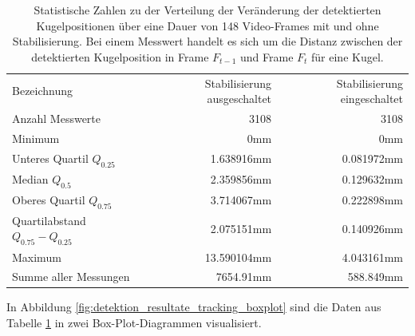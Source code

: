 \begin{table}[ht]
    \begin{tabular}{ lrr }
        \rowcolor{\seccolor!50}
        Bezeichnung & Stabilisierung ausgeschaltet & Stabilisierung eingeschaltet\\
        Anzahl Messwerte & 3108 & 3108\\
        Minimum & 0mm & 0mm\\
        Unteres Quartil $Q_{0.25}$ & 1.638916mm & 0.081972mm\\
        Median $Q_{0.5}$ & 2.359856mm & 0.129632mm\\
        Oberes Quartil $Q_{0.75}$ & 3.714067mm & 0.222898mm\\
        Quartilabstand $Q_{0.75} - Q_{0.25}$ & 2.075151mm & 0.140926mm\\
        Maximum & 13.590104mm & 4.043161mm\\
        Summe aller Messungen & 7654.91mm & 588.849mm
    \end{tabular}
    \caption{
        Statistische Zahlen zu der Verteilung der Veränderung der detektierten Kugelpositionen über eine Dauer von
        148 Video-Frames mit und ohne Stabilisierung.
        Bei einem Messwert handelt es sich um die Distanz zwischen der detektierten Kugelposition in Frame $F_{t-1}$
        und Frame $F_{t}$ für eine Kugel.
    }
    \label{tab:detektion_resultate_tracking_stats}
\end{table}

In Abbildung \ref{fig:detektion_resultate_tracking_boxplot} sind die Daten aus Tabelle \ref{tab:detektion_resultate_tracking_stats}
in zwei Box-Plot-Diagrammen visualisiert.

